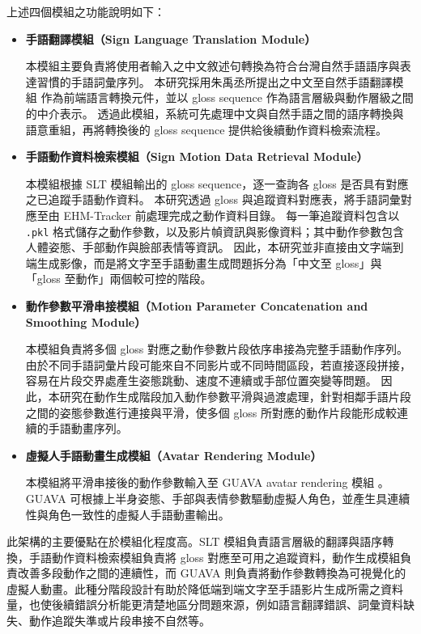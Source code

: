 \documentclass[class=NCU_thesis, crop=false]{standalone}
\begin{document}
上述四個模組之功能說明如下：

\begin{itemize}
    \item \textbf{手語翻譯模組（Sign Language Translation Module）}

    本模組主要負責將使用者輸入之中文敘述句轉換為符合台灣自然手語語序與表達習慣的手語詞彙序列。
    本研究採用朱禹丞所提出之中文至自然手語翻譯模組 \cite{Chu2025SLT} 作為前端語言轉換元件，並以 gloss sequence 作為語言層級與動作層級之間的中介表示。
    透過此模組，系統可先處理中文與自然手語之間的語序轉換與語意重組，再將轉換後的 gloss sequence 提供給後續動作資料檢索流程。

    \item \textbf{手語動作資料檢索模組（Sign Motion Data Retrieval Module）}

    本模組根據 SLT 模組輸出的 gloss sequence，逐一查詢各 gloss 是否具有對應之已追蹤手語動作資料。
    本研究透過 gloss 與追蹤資料對應表，將手語詞彙對應至由 EHM-Tracker \cite{zhang2025guava} 前處理完成之動作資料目錄。
    每一筆追蹤資料包含以 \texttt{.pkl} 格式儲存之動作參數，以及影片幀資訊與影像資料；其中動作參數包含人體姿態、手部動作與臉部表情等資訊。
    因此，本研究並非直接由文字端到端生成影像，而是將文字至手語動畫生成問題拆分為「中文至 gloss」與「gloss 至動作」兩個較可控的階段。

    \item \textbf{動作參數平滑串接模組（Motion Parameter Concatenation and Smoothing Module）}

    本模組負責將多個 gloss 對應之動作參數片段依序串接為完整手語動作序列。
    由於不同手語詞彙片段可能來自不同影片或不同時間區段，若直接逐段拼接，容易在片段交界處產生姿態跳動、速度不連續或手部位置突變等問題。
    因此，本研究在動作生成階段加入動作參數平滑與過渡處理，針對相鄰手語片段之間的姿態參數進行連接與平滑，使多個 gloss 所對應的動作片段能形成較連續的手語動畫序列。

    \item \textbf{虛擬人手語動畫生成模組（Avatar Rendering Module）}

    本模組將平滑串接後的動作參數輸入至 GUAVA avatar rendering 模組 \cite{zhang2025guava}。
    GUAVA 可根據上半身姿態、手部與表情參數驅動虛擬人角色，並產生具連續性與角色一致性的虛擬人手語動畫輸出。
\end{itemize}

此架構的主要優點在於模組化程度高。SLT 模組負責語言層級的翻譯與語序轉換，手語動作資料檢索模組負責將 gloss 對應至可用之追蹤資料，動作生成模組負責改善多段動作之間的連續性，而 GUAVA 則負責將動作參數轉換為可視覺化的虛擬人動畫。此種分階段設計有助於降低端到端文字至手語影片生成所需之資料量，也使後續錯誤分析能更清楚地區分問題來源，例如語言翻譯錯誤、詞彙資料缺失、動作追蹤失準或片段串接不自然等。
\end{document}
